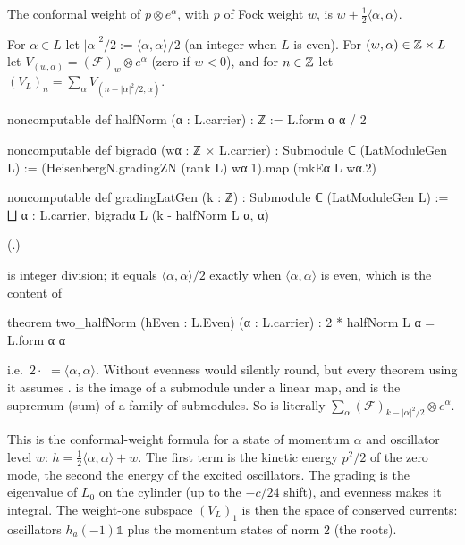 The conformal weight of $p\otimes e^\alpha$, with $p$ of Fock weight $w$, is
$w+\tfrac12\langle\alpha,\alpha\rangle$.

\begin{definition}[Grading of $V_L$]\label{ch03:def:gradingLatGen}
For $\alpha\in L$ let $|\alpha|^2/2:=\langle\alpha,\alpha\rangle/2$ (an integer when $L$ is even).
For $(w,\alpha)\in{\mathbb{Z}}\times L$ let $V_{(w,\alpha)}=(\mathcal F)_w\otimes e^\alpha$ (zero if $w<0$),
and for $n\in{\mathbb{Z}}$ let $(V_L)_n=\sum_\alpha V_{(n-|\alpha|^2/2,\alpha)}$.
\end{definition}
\begin{leancode}
noncomputable def halfNorm (α : L.carrier) : ℤ := L.form α α / 2

noncomputable def bigradα (wα : ℤ × L.carrier) : Submodule ℂ (LatModuleGen L) :=
  (HeisenbergN.gradingZN (rank L) wα.1).map (mkEα L wα.2)

noncomputable def gradingLatGen (k : ℤ) : Submodule ℂ (LatModuleGen L) :=
  ⨆ α : L.carrier, bigradα L (k - halfNorm L α, α)
\end{leancode}
(.)

\begin{dictionary}
 is integer division; it equals $\langle\alpha,\alpha\rangle/2$ exactly when
$\langle\alpha,\alpha\rangle$ is even, which is the content of
\begin{leancode}
theorem two_halfNorm (hEven : L.Even) (α : L.carrier) : 2 * halfNorm L α = L.form α α
\end{leancode}
i.e.\ $2\cdot$ $=\langle\alpha,\alpha\rangle$. Without evenness  would
silently round, but every theorem using it assumes .  is the
image of a submodule under a linear map, and  is the supremum (sum) of a family of
submodules. So  is literally $\sum_\alpha(\mathcal F)_{k-|\alpha|^2/2}
\otimes e^\alpha$.
\end{dictionary}

\begin{physics}
This is the conformal-weight formula for a state of momentum $\alpha$ and oscillator level $w$: $h=\frac12\langle\alpha,\alpha\rangle+w$. The first term is the kinetic energy $p^2/2$ of the zero mode, the second the energy of the excited oscillators. The grading is the eigenvalue of $L_0$ on the cylinder (up to the $-c/24$ shift), and evenness makes it integral. The weight-one subspace $(V_L)_1$ is then the space of conserved currents: oscillators $h_a(-1)\mathbb1$ plus the momentum states of norm $2$ (the roots).
\end{physics}

